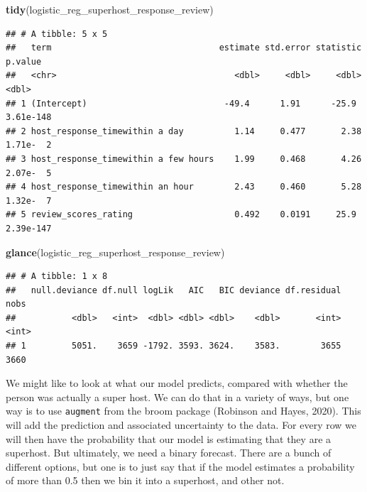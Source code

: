 \documentclass[
]{book}
\newenvironment{Shaded}{\begin{snugshade}}{\end{snugshade}}
\newcommand{\KeywordTok}[1]{\textcolor[rgb]{0.13,0.29,0.53}{\textbf{#1}}}
\newcommand{\NormalTok}[1]{#1}
\begin{document}
\begin{Shaded}
\begin{Highlighting}[]
\KeywordTok{tidy}\NormalTok{(logistic_reg_superhost_response_review)}
\end{Highlighting}
\end{Shaded}

\begin{verbatim}
## # A tibble: 5 x 5
##   term                                 estimate std.error statistic   p.value
##   <chr>                                   <dbl>     <dbl>     <dbl>     <dbl>
## 1 (Intercept)                           -49.4      1.91      -25.9  3.61e-148
## 2 host_response_timewithin a day          1.14     0.477       2.38 1.71e-  2
## 3 host_response_timewithin a few hours    1.99     0.468       4.26 2.07e-  5
## 4 host_response_timewithin an hour        2.43     0.460       5.28 1.32e-  7
## 5 review_scores_rating                    0.492    0.0191     25.9  2.39e-147
\end{verbatim}

\begin{Shaded}
\begin{Highlighting}[]
\KeywordTok{glance}\NormalTok{(logistic_reg_superhost_response_review)}
\end{Highlighting}
\end{Shaded}

\begin{verbatim}
## # A tibble: 1 x 8
##   null.deviance df.null logLik   AIC   BIC deviance df.residual  nobs
##           <dbl>   <int>  <dbl> <dbl> <dbl>    <dbl>       <int> <int>
## 1         5051.    3659 -1792. 3593. 3624.    3583.        3655  3660
\end{verbatim}

We might like to look at what our model predicts, compared with whether the person was actually a super host. We can do that in a variety of ways, but one way is to use \texttt{augment} from the broom package (Robinson and Hayes, 2020). This will add the prediction and associated uncertainty to the data. For every row we will then have the probability that our model is estimating that they are a superhost. But ultimately, we need a binary forecast. There are a bunch of different options, but one is to just say that if the model estimates a probability of more than 0.5 then we bin it into a superhost, and other not.
\end{document}
